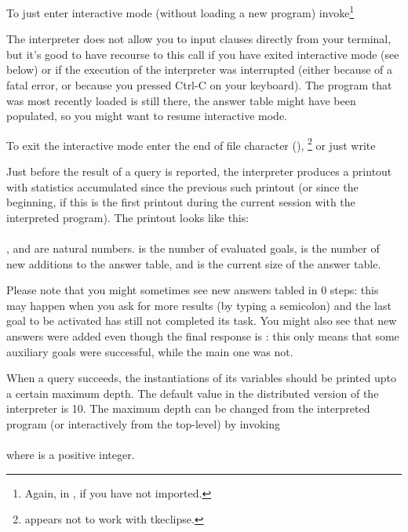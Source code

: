 To just enter interactive mode (without loading a new program)
invoke\footnote{
  Again,  in \Eclipse{}, if you have not imported.}\\
\ind{}

The interpreter does not allow you to input clauses directly from your
terminal, but it's good to have recourse to this call if you have exited
interactive mode (see below) or if the execution of the interpreter was
interrupted (either because of a fatal error, or because you pressed Ctrl-C
on your keyboard). The program that was most recently loaded is still there,
the answer table might have been populated, so you might want to resume
interactive mode.


%

To exit the interactive mode enter the end of file character
(),%
\footnote{
   appears not to work with tkeclipse.}
or just write\\
\ind{}


%

Just before the result of a query is reported, the interpreter produces a
printout with statistics accumulated since the previous
such printout (or since the beginning, if this is the first printout during
the current session with the interpreted program). The printout looks like
this:\\
\ind{}\\
, and  are natural numbers.  is the number of
evaluated goals,  is the number of new additions to the answer table,
and  is the current size of the answer table.

Please note that you might sometimes see new answers tabled in 0 steps: this
may happen when you ask for more results (by typing a semicolon) and the last
goal to be activated has still not completed its task.  You might also see
that new answers were added even though the final response is : this
only means that some auxiliary goals were successful, while the main one was
not.


%

When a query succeeds, the instantiations of its variables should be printed
upto a certain maximum depth.  The default value in the distributed version
of the interpreter is 10.  The maximum depth can be changed from the
interpreted program (or interactively from the top-level) by invoking\\
\ind{}\\
where  is a positive integer.


